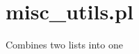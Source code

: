 


\section{misc_utils.pl}

\label{sec:miscutils}

\begin{description}
Combines two lists into one
\end{description}

